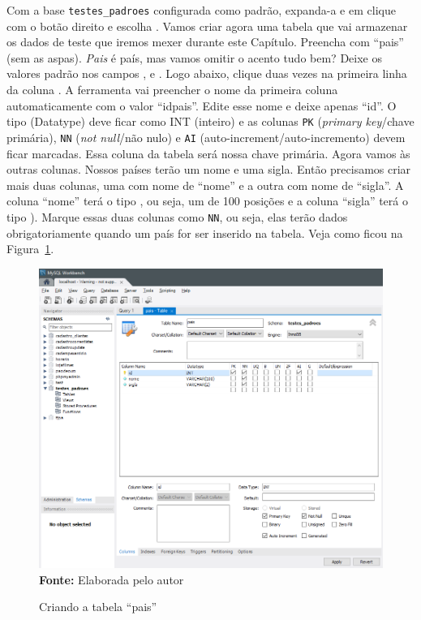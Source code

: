 Com a base \texttt{testes\_padroes} configurada como padrão, expanda-a e em  clique com o botão direito e escolha . Vamos criar agora uma tabela que vai armazenar os dados de teste que iremos mexer durante este Capítulo. Preencha  com ``pais'' (sem as aspas). \textit{Pais} é país, mas vamos omitir o acento tudo bem? Deixe os valores padrão nos campos ,  e . Logo abaixo, clique duas vezes na primeira linha da coluna . A ferramenta vai preencher o nome da primeira coluna automaticamente com o valor ``idpais''. Edite esse nome e deixe apenas ``id''. O tipo (Datatype) deve ficar como INT (inteiro) e as colunas \texttt{PK} (\textit{primary key}/chave primária), \texttt{NN} (\textit{not null}/não nulo) e \texttt{AI} (auto-increment/auto-incremento) devem ficar marcadas. Essa coluna da tabela será nossa chave primária. Agora vamos às outras colunas. Nossos países terão um nome e uma sigla. Então precisamos criar mais duas colunas, uma com nome de ``nome'' e a outra com nome de ``sigla''. A coluna ``nome'' terá o tipo , ou seja, um  de 100 posições e a coluna ``sigla'' terá o tipo ). Marque essas duas colunas como \texttt{NN}, ou seja, elas terão dados obrigatoriamente quando um país for ser inserido na tabela. Veja como ficou na Figura~\ref{fig:cap04CriandoTabelaPais}.

\FloatBarrier
\begin{figure}[!htbp]
    \centering
    \caption{Criando a tabela ``pais''}
    \includegraphics[scale=0.6]{imagens/cap04CriandoTabelaPais}
    \\\textbf{Fonte:} Elaborada pelo autor
    \label{fig:cap04CriandoTabelaPais}
\end{figure}
\FloatBarrier

